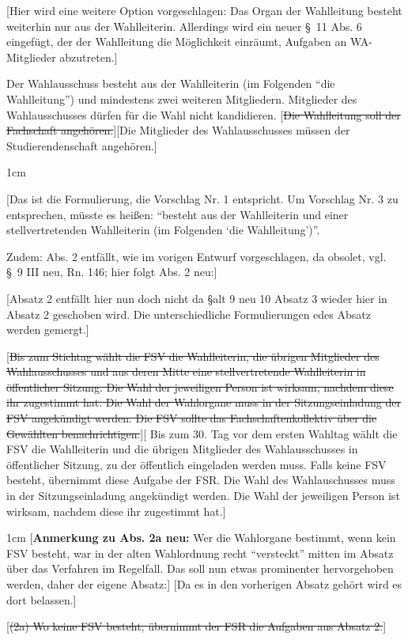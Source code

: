 \documentclass[%
draft,%
multilinesections%
]{fswo}
\newcommand\oldT[1]  {{\color{Gray}[\st{#1}]}}
\newcommand\newT[1]  {{\color{Green}[#1]}}
\newcommand\bemFr[1] {{\color{Red}[#1]}}
\newcommand\bemFe[1] {{\color{Cyan}[#1]}}
\newcommand\bemTi[1] {{\color{Cyan}[#1]}} %
\newcommand\remark[1]{\begin{addmargin}{1cm}#1\end{addmargin}}
\newcommand\oldT[1]{}%
\newcommand\newT[1]{#1}
\newcommand\bemFr[1]{}%
\newcommand\bemFe[1]{}%
\newcommand\bemTi[1]{}%
\newcommand\remark[1]{}
\newcommand\change[2]{\oldT{#1}\newT{#2}}
\begin{document}
\bemFe{Hier wird eine weitere Option vorgeschlagen: Das Organ der Wahlleitung besteht weiterhin nur aus der Wahlleiterin. Allerdings wird ein neuer \S~11 Abs. 6 eingefügt, der der Wahlleitung die Möglichkeit einräumt, Aufgaben an WA-Mitglieder abzutreten.}

\begin{contract}
Der Wahlausschuss besteht aus der Wahlleiterin (im Folgenden \enquote{die Wahlleitung}) und mindestens zwei weiteren Mitgliedern.
Mitglieder des Wahlausschusses dürfen für die Wahl nicht kandidieren.
\change{Die Wahlleitung soll der Fachschaft angehören.}{Die Mitglieder des Wahlausschusses müssen der Studierendenschaft angehören.}%
%
\remark{%
\bemFr{Das ist die Formulierung, die Vorschlag Nr. 1 entspricht.
Um Vorschlag Nr. 3 zu entsprechen, müsste es heißen: \enquote{besteht aus der Wahlleiterin und einer stellvertretenden Wahlleiterin (im Folgenden \enquote{die Wahlleitung})}.

Zudem: Abs. 2 entfällt, wie im vorigen Entwurf vorgeschlagen, da obsolet, vgl. \S~9 III neu, Rn. 146; hier folgt Abs. 2 neu:}
}
\bemTi{Absatz 2 entfällt hier nun doch nicht da \S alt 9 neu 10 Absatz 3 wieder hier in Absatz 2 geschoben wird. Die unterschiedliche Formulierungen edes Absatz werden gemergt.}

\change{Bis zum Stichtag wählt die FSV die Wahlleiterin, die übrigen Mitglieder des Wahlausschusses und aus deren Mitte eine stellvertretende Wahlleiterin in öffentlicher Sitzung.
Die Wahl der jeweiligen Person ist wirksam, nachdem diese ihr zugestimmt hat.
Die Wahl der Wahlorgane muss in der Sitzungseinladung der FSV angekündigt werden.
Die FSV sollte das Fachschaftenkollektiv über die Gewählten benachrichtigen.}{%
Bis zum 30. Tag vor dem ersten Wahltag wählt die FSV die Wahlleiterin und die übrigen Mitglieder des Wahlausschusses in öffentlicher Sitzung, zu der öffentlich eingeladen werden muss.
Falls keine FSV besteht, übernimmt diese Aufgabe der FSR.
Die Wahl des Wahlauschusses muss in der Sitzungseinladung angekündigt werden.
Die Wahl der jeweiligen Person ist wirksam, nachdem diese ihr zugestimmt hat.}
%
\remark{%
\bemFr{\textbf{Anmerkung zu Abs. 2a neu:} Wer die Wahlorgane bestimmt, wenn kein FSV besteht,
war in der alten Wahlordnung recht \enquote{versteckt} mitten im Absatz über das Verfahren im Regelfall.
Das soll nun etwas prominenter hervorgehoben werden, daher der eigene Absatz:}
\bemTi{Da es in den vorherigen Absatz gehört wird es dort belassen.}
}
%
\oldT{(2a) Wo keine FSV besteht, übernimmt der FSR die Aufgaben aus Absatz 2.}



\end{contract}
\end{document}
